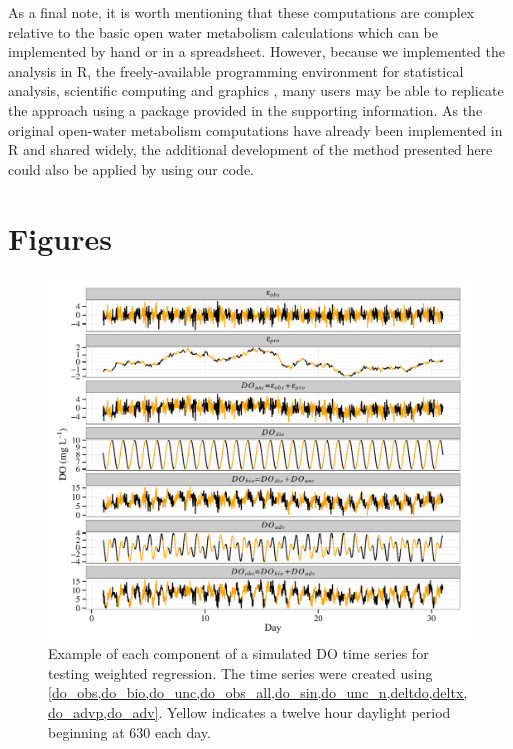 \documentclass[letterpaper,12pt,oneside]{article}\usepackage[]{graphicx}\usepackage[]{color}
\makeatletter
\def\maxwidth{ %
  \ifdim\Gin@nat@width>\linewidth
    \linewidth
  \else
    \Gin@nat@width
  \fi
}
\newenvironment{knitrout}{}{} %
\makeatother
\begin{document}
As a final note, it is worth mentioning that these computations are complex relative to the basic open water metabolism calculations which can be implemented by hand or in a spreadsheet.  However, because we implemented the analysis in R, the freely-available programming environment for statistical analysis, scientific computing and graphics , many users may be able to replicate the approach using a package provided in the supporting information.  As the original open-water metabolism computations have already been implemented in R and shared widely, the additional development of the method presented here could also be applied by using our code.

\clearpage
\begin{singlespace}


\end{singlespace}
\clearpage


\section{Figures}

\centering\vspace*{\fill}
\begin{knitrout}
\color{fgcolor}\begin{figure}[!ht]


{\centering \includegraphics[width=\maxwidth]{figure/do_sim} 

}

\caption[Example of each component of a simulated \ac{DO} time series for testing weighted regression]{Example of each component of a simulated \ac{DO} time series for testing weighted regression.  The time series were created using \cref{do_obs,do_bio,do_unc,do_obs_all,do_sin,do_unc_n,deltdo,deltx,do_advp,do_adv}. Yellow indicates a twelve hour daylight period beginning at 630 each day.\label{fig:do_sim}}
\end{figure}


\end{knitrout}
\vfill
\clearpage
\end{document}
